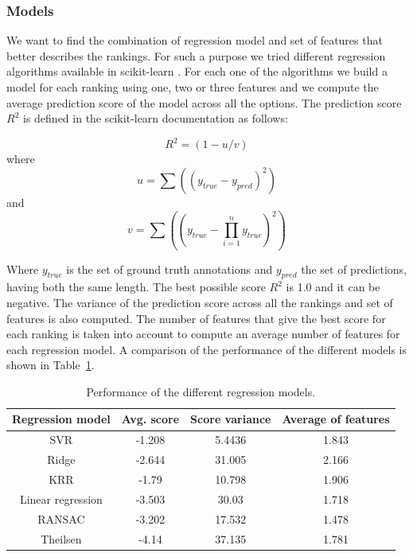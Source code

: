 \documentclass{article}
\begin{document}
\subsubsection{Models}
We want to find the combination of regression model and set of features that better describes the rankings. For such a purpose we tried different regression algorithms available in scikit-learn \cite{08}.  For each one of the algorithms we build a model for each ranking using one, two or three features and we compute the average prediction score of the model across all the options. The prediction score $R^2$ is defined in the scikit-learn documentation as follows:

\begin{equation}
 R^2 = (1 - u/v) 
\end{equation}
where
\begin{equation}
	u = \sum\nolimits((y_{true} - y_{pred})^2)
\end{equation}
and
\begin{equation}
	v = \sum\nolimits((y_{true} - \prod\limits_{i=1}^n y_{true})^2)
\end{equation}

Where $y_{true}$ is the set of ground truth annotations and $y_{pred}$ the set of predictions, having both the same length. The best possible score $R^2$ is 1.0 and it can be negative.
The variance of the prediction score across all the rankings and set of features is also computed. 
The number of features that give the best score for each ranking is taken into account to compute an average number of features for each regression model. A comparison of the performance of the different models is shown in Table~\ref{models}.

\begin{table}[ht]
\centering
\label{my-label}
\begin{tabular}{cccc}
\hline
Regression model  & Avg. score & Score variance & Average of features \\ \hline
SVR               & -1.208     & 5.4436         & 1.843               \\
Ridge             & -2.644     & 31.005         & 2.166               \\
KRR               & -1.79      & 10.798         & 1.906               \\
Linear regression & -3.503     & 30.03          & 1.718               \\
RANSAC            & -3.202     & 17.532         & 1.478               \\
Theilsen          & -4.14      & 37.135         & 1.781               \\ \hline
\end{tabular}
\caption{Performance of the different regression models.}
\label{models}
\end{table}
\end{document}
